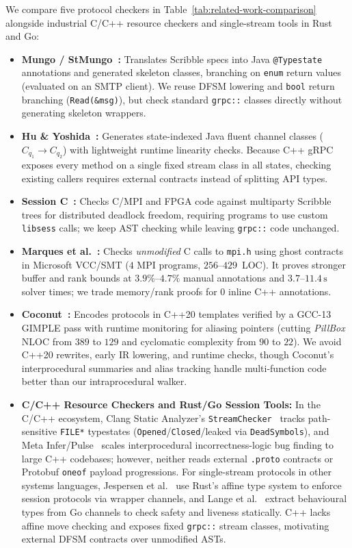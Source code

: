 We compare five protocol checkers in Table~\ref{tab:related-work-comparison} alongside industrial C/C++ resource checkers and single-stream tools in Rust and Go:
\begin{itemize}
    \item \textbf{Mungo / StMungo~\cite{kouzapas-et-al-2016}:} Translates Scribble specs into Java \texttt{@Typestate} annotations and generated skeleton classes, branching on \texttt{enum} return values (evaluated on an SMTP client). We reuse DFSM lowering and \texttt{bool} return branching (\texttt{Read(\&msg)}), but check standard \texttt{grpc::} classes directly without generating skeleton wrappers.
    \item \textbf{Hu \& Yoshida~\cite{hu-yoshida-2016}:} Generates state-indexed Java fluent channel classes ($C_{q_1} \to C_{q_2}$) with lightweight runtime linearity checks. Because C++ gRPC exposes every method on a single fixed stream class in all states, checking existing callers requires external contracts instead of splitting API types.
    \item \textbf{Session C~\cite{ng-yoshida-honda-2012-cc, ng-et-al-2012}:} Checks C/MPI and FPGA code against multiparty Scribble trees for distributed deadlock freedom, requiring programs to use custom \texttt{libsess} calls; we keep AST checking while leaving \texttt{grpc::} code unchanged.
    \item \textbf{Marques et al.~\cite{marques-et-al-2013}:} Checks \emph{unmodified} C calls to \texttt{mpi.h} using ghost contracts in Microsoft VCC/SMT ($4$ MPI programs, $256$--$429$~LOC). It proves stronger buffer and rank bounds at $3.9\%$--$4.7\%$ manual annotations and $3.7$--$11.4\,\mathrm{s}$ solver times; we trade memory/rank proofs for $0$ inline C++ annotations.
    \item \textbf{Coconut~\cite{alsubhi-et-al-2025}:} Encodes protocols in C++20 templates verified by a GCC-13 GIMPLE pass with runtime monitoring for aliasing pointers (cutting \emph{PillBox} NLOC from $389$ to $129$ and cyclomatic complexity from $90$ to $22$). We avoid C++20 rewrites, early IR lowering, and runtime checks, though Coconut's interprocedural summaries and alias tracking handle multi-function code better than our intraprocedural walker.
    \item \textbf{C/C++ Resource Checkers and Rust/Go Session Tools:} In the C/C++ ecosystem, Clang Static Analyzer's \texttt{StreamChecker}~\cite{clang-streamchecker} tracks path-sensitive \texttt{FILE*} typestates (\texttt{Opened}/\texttt{Closed}/leaked via \texttt{DeadSymbols}), and Meta Infer/Pulse~\cite{le-et-al-2022} scales interprocedural incorrectness-logic bug finding to large C++ codebases; however, neither reads external \texttt{.proto} contracts or Protobuf \texttt{oneof} payload progressions. For single-stream protocols in other systems languages, Jespersen et al.~\cite{jespersen-et-al-2015} use Rust's affine type system to enforce session protocols via wrapper channels, and Lange et al.~\cite{lange-et-al-2018} extract behavioural types from Go channels to check safety and liveness statically. C++ lacks affine move checking and exposes fixed \texttt{grpc::} stream classes, motivating external DFSM contracts over unmodified ASTs.
\end{itemize}


